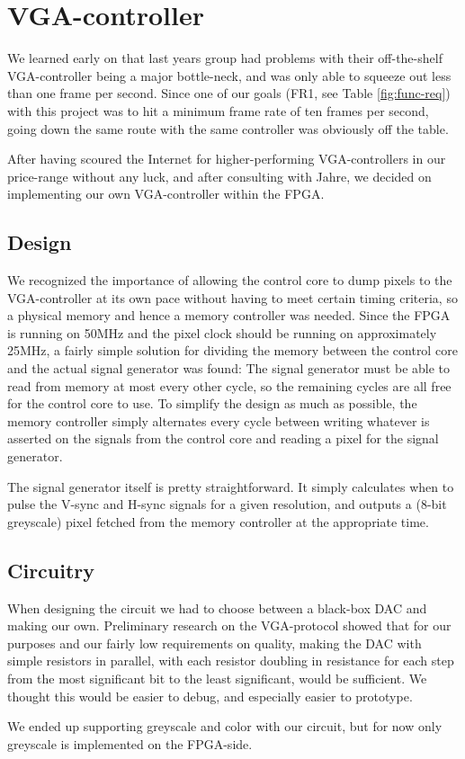 \section{VGA-controller}

We learned early on that last years group had problems with their off-the-shelf
VGA-controller being a major bottle-neck, and was only able to squeeze out less
than one frame per second. Since one of our goals ({\sc FR1}, see Table
\ref{fig:func-req}) with this project was to hit a minimum frame rate of ten
frames per second, going down the same route with the same controller was
obviously off the table.

After having scoured the Internet for higher-performing VGA-controllers in our
price-range without any luck, and after consulting with Jahre, we decided on
implementing our own VGA-controller within the FPGA.



\subsection{Design}
We recognized the importance of allowing the control core to dump pixels to the
VGA-controller at its own pace without having to meet certain timing criteria,
so a physical memory and hence a memory controller was needed. Since the FPGA
is running on 50MHz and the pixel clock should be running on approximately
25MHz, a fairly simple solution for dividing the memory between the control
core and the actual signal generator was found: The signal generator must be
able to read from memory at most every other cycle, so the remaining cycles are
all free for the control core to use. To simplify the design as much as
possible, the memory controller simply alternates every cycle between writing
whatever is asserted on the signals from the control core and reading a pixel
for the signal generator.

The signal generator itself is pretty straightforward. It simply calculates
when to pulse the V-sync and H-sync signals for a given resolution, and outputs
a (8-bit greyscale) pixel fetched from the memory controller at the appropriate
time.

\subsection{Circuitry}
 When designing the
circuit we had to choose between a black-box DAC
and making our own. Preliminary research on the VGA-protocol showed that for
our purposes and our fairly low requirements on quality, making the DAC with
simple resistors in parallel, with each resistor doubling in resistance for
each step from the most significant bit to the least significant, would be
sufficient. We thought this would be easier to debug, and especially easier to
prototype.

We ended up supporting greyscale and color with our circuit, but for now only
greyscale is implemented on the FPGA-side.
